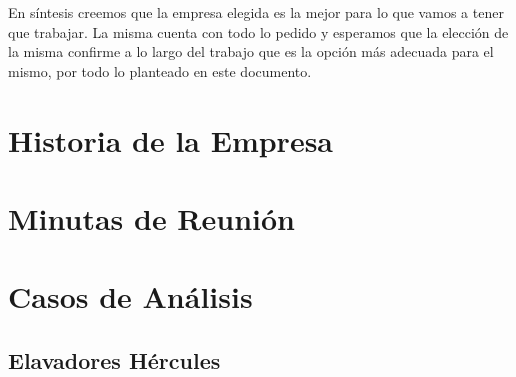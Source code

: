 \documentclass[12pt,a4paper,spanish]{article}
\begin{document}
En s\'{i}ntesis creemos que la empresa elegida es la mejor para lo que vamos a tener que trabajar. La misma cuenta con todo lo pedido y esperamos que la elecci\'{o}n de la misma confirme a lo largo del trabajo que es la opci\'on m\'as adecuada para el mismo, por todo lo planteado en este documento.

\section{Historia de la Empresa}
\section{Minutas de Reuni\'{o}n}
\section{Casos de An\'{a}lisis}
\subsection{Elavadores H\'{e}rcules}
\end{document}
